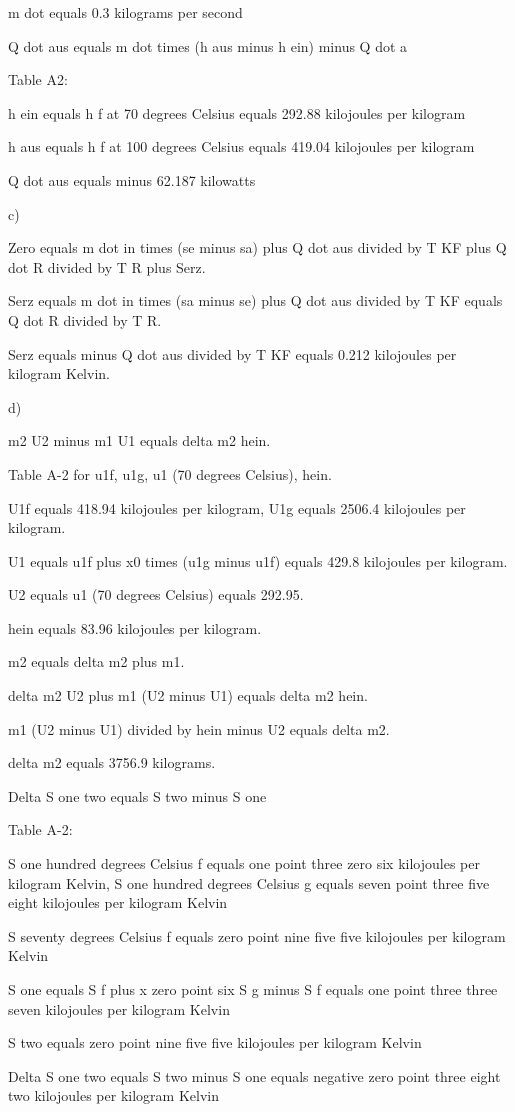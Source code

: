 m dot equals 0.3 kilograms per second

Q dot aus equals m dot times (h aus minus h ein) minus Q dot a

Table A2:

h ein equals h f at 70 degrees Celsius equals 292.88 kilojoules per kilogram

h aus equals h f at 100 degrees Celsius equals 419.04 kilojoules per kilogram

Q dot aus equals minus 62.187 kilowatts

c)

Zero equals m dot in times (se minus sa) plus Q dot aus divided by T KF plus Q dot R divided by T R plus Serz.

Serz equals m dot in times (sa minus se) plus Q dot aus divided by T KF equals Q dot R divided by T R.

Serz equals minus Q dot aus divided by T KF equals 0.212 kilojoules per kilogram Kelvin.

d)

m2 U2 minus m1 U1 equals delta m2 hein.

Table A-2 for u1f, u1g, u1 (70 degrees Celsius), hein.

U1f equals 418.94 kilojoules per kilogram, U1g equals 2506.4 kilojoules per kilogram.

U1 equals u1f plus x0 times (u1g minus u1f) equals 429.8 kilojoules per kilogram.

U2 equals u1 (70 degrees Celsius) equals 292.95.

hein equals 83.96 kilojoules per kilogram.

m2 equals delta m2 plus m1.

delta m2 U2 plus m1 (U2 minus U1) equals delta m2 hein.

m1 (U2 minus U1) divided by hein minus U2 equals delta m2.

delta m2 equals 3756.9 kilograms.

Delta S one two equals S two minus S one

Table A-2:

S one hundred degrees Celsius f equals one point three zero six kilojoules per kilogram Kelvin, S one hundred degrees Celsius g equals seven point three five eight kilojoules per kilogram Kelvin

S seventy degrees Celsius f equals zero point nine five five kilojoules per kilogram Kelvin

S one equals S f plus x zero point six S g minus S f equals one point three three seven kilojoules per kilogram Kelvin

S two equals zero point nine five five kilojoules per kilogram Kelvin

Delta S one two equals S two minus S one equals negative zero point three eight two kilojoules per kilogram Kelvin